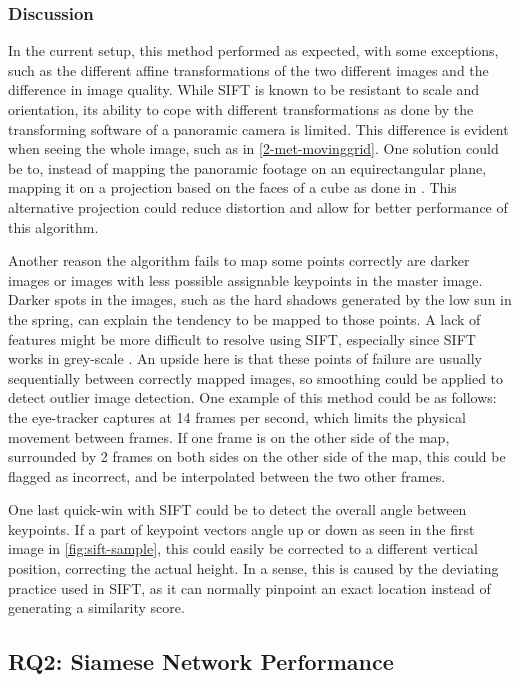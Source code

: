 \documentclass[sigconf, natbib=false, nonacm]{acmart}
\begin{document}
        \subsubsection{Discussion}
        In the current setup, this method performed as expected, with some exceptions, such as the different affine transformations of the two different images and the difference in image quality. While SIFT is known to be resistant to scale and orientation, its ability to cope with different transformations as done by the transforming software of a panoramic camera is limited. This difference is evident when seeing the whole image, such as in \autoref{2-met-movinggrid}. One solution could be to, instead of mapping the panoramic footage on an equirectangular plane, mapping it on a projection based on the faces of a cube as done in \cite{Davidson2020}. This alternative projection could reduce distortion and allow for better performance of this algorithm. 
        
        Another reason the algorithm fails to map some points correctly are darker images or images with less possible assignable keypoints in the master image. Darker spots in the images, such as the hard shadows generated by the low sun in the spring, can explain the tendency to be mapped to those points. A lack of features might be more difficult to resolve using SIFT, especially since SIFT works in grey-scale \cite{Low2004}. An upside here is that these points of failure are usually sequentially between correctly mapped images, so smoothing could be applied to detect outlier image detection. One example of this method could be as follows: the eye-tracker captures at 14 frames per second, which limits the physical movement between frames. If one frame is on the other side of the map, surrounded by 2 frames on both sides on the other side of the map, this could be flagged as incorrect, and be interpolated between the two other frames. 
        
        One last quick-win with SIFT could be to detect the overall angle between keypoints. If a part of keypoint vectors angle up or down as seen in the first image in \autoref{fig:sift-sample}, this could easily be corrected to a different vertical position, correcting the actual height. In a sense, this is caused by the deviating practice used in SIFT, as it can normally pinpoint an exact location instead of generating a similarity score. 
    
    \subsection{RQ2: Siamese Network Performance}
\end{document}
